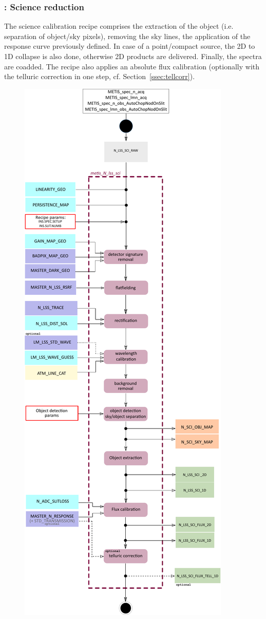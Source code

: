 \subsubsection{:  Science reduction}\label{rec:metis_n_lss_sci}
The science calibration recipe comprises the extraction of the object (i.e. separation of object/sky pixels), removing the sky lines, the application of the response curve previously defined. In case of a point/compact source, the 2D to 1D collapse is also done, otherwise 2D products are delivered. Finally, the spectra are coadded. The recipe also applies an absolute flux calibration (optionally with the telluric correction in one step, cf. Section~\ref{ssec:tellcorr}).
\begin{figure}[ht]
  \centering
  \includegraphics[width=0.35\textheight]{figures/metis_n_lss_sci_v0.83.pdf}

\end{figure}
